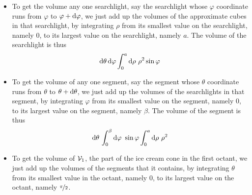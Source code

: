 \begin{eg}
\begin{itemize}
\item
To get the volume any one searchlight, say the searchlight whose 
$\varphi$ coordinate runs from $\varphi$ to $\varphi+\mathrm{d}\varphi$, 
we just add up the volumes of the approximate cubes in that searchlight, 
by integrating $\rho$ from its smallest value on the searchlight, namely $0$, 
to its largest value on the searchlight, namely $a$. The volume of the 
searchlight is thus
\begin{align*}
\mathrm{d}\theta\,\mathrm{d}\varphi\int_0^a\mathrm{d}\rho\  \rho^2\sin\varphi
\end{align*}

\item
To get the volume of any one segment, say the segment whose $\theta$ 
coordinate runs from $\theta$ to $\theta+\mathrm{d}\theta$, we just 
add up the volumes of the searchlights in that segment, by integrating 
$\varphi$ from its smallest value on the segment, namely $0$, to its 
largest value on the segment, namely $\beta$. The volume of the segment 
is thus
\begin{align*}
\mathrm{d}\theta\,\int_0^\beta \mathrm{d}\varphi\ \sin\varphi
               \int_0^a\mathrm{d}\rho\  \rho^2
\end{align*}

\item
To get the volume of $\mathcal{V}_1$, the part of the ice cream cone in the first 
octant, we just add up the volumes of the segments that it contains, by 
integrating $\theta$ from its smallest value in the octant, namely $0$, to its largest value on the octant, namely  $\nicefrac{\pi}{2}$. 


\end{itemize}
\end{eg}
